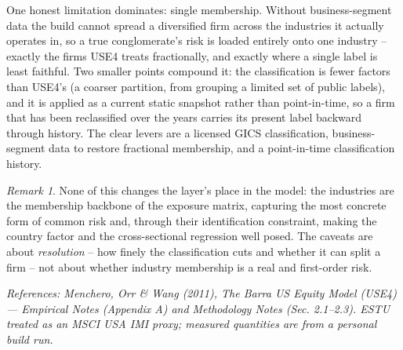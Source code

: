 \documentclass[11pt]{article}
\theoremstyle{definition}
\theoremstyle{plain}
\theoremstyle{remark}
\newtheorem*{remark}{Remark}
\begin{document}
\begin{pitfall}
One honest limitation dominates: single membership. Without business-segment data the build cannot spread a diversified firm across the industries it actually operates in, so a true conglomerate's risk is loaded entirely onto one industry -- exactly the firms USE4 treats fractionally, and exactly where a single label is least faithful. Two smaller points compound it: the classification is fewer factors than USE4's (a coarser partition, from grouping a limited set of public labels), and it is applied as a current static snapshot rather than point-in-time, so a firm that has been reclassified over the years carries its present label backward through history. The clear levers are a licensed GICS classification, business-segment data to restore fractional membership, and a point-in-time classification history.
\end{pitfall}

\begin{remark}
None of this changes the layer's place in the model: the industries are the membership backbone of the exposure matrix, capturing the most concrete form of common risk and, through their identification constraint, making the country factor and the cross-sectional regression well posed. The caveats are about \emph{resolution} -- how finely the classification cuts and whether it can split a firm -- not about whether industry membership is a real and first-order risk.
\end{remark}

\begin{center}\small\itshape
References: Menchero, Orr \& Wang (2011), \textit{The Barra US Equity Model (USE4)} --- Empirical Notes (Appendix A) and Methodology Notes (Sec. 2.1--2.3). ESTU treated as an MSCI USA IMI proxy; measured quantities are from a personal build run.
\end{center}
\end{document}
